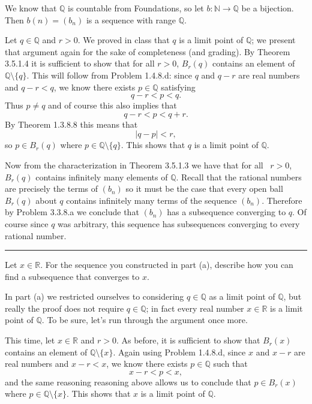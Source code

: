\documentclass[12pt]{article}
\newcommand{\R}{\mathbb R} %
\newcommand{\N}{\mathbb N} %
\newcommand{\Q}{\mathbb Q} %
\newcommand{\ran}{\mathcal{R}an}
\newenvironment{ppart}[1]{\noindent {\bf (#1) }}{\medskip}
\newenvironment{proof}{\noindent {\bf Proof: }}{\hfill
\rule{1mm}{3mm} \bigskip}
\newcommand{\sing}[1]{\{#1\}}
\begin{document}
\begin{proof} We know that $\Q$ is countable from Foundations, so let $b:\N\to\Q$ be a bijection. Then $b(n)=(b_n)$ is a sequence with range $\Q$.

Let $q\in\Q$ and $r>0$. We proved in class that $q$ is a limit point of $\Q$; we present that argument again for the sake of completeness (and grading). By Theorem 3.5.1.4 it is sufficient to show that for all $r>0$, $B_r(q)$ contains an element of $\Q\setminus\{q\}$. This will follow from Problem 1.4.8.d: since $q$ and $q-r$ are real numbers and $q-r<q$, we know there exists $p\in\Q$ satisfying $$q-r<p<q.$$ Thus $p\ne q$ and of course this also implies that $$q-r<p<q+r.$$ By Theorem 1.3.8.8 this means that $$|q-p|<r,$$ so $p\in B_r(q)$ where $p\in\Q\setminus\{q\}$. This shows that $q$ is a limit point of $\Q$.

Now from the characterization in Theorem 3.5.1.3 we have that for all \ $r>0$, $B_r(q)$ contains infinitely many elements of $\Q$. Recall that the rational numbers are precisely the terms of $(b_n)$ so it must be the case that every open ball $B_r(q)$ about $q$ contains infinitely many terms of the sequence $(b_n)$. %
 Therefore by Problem 3.3.8.a we conclude that $(b_n)$ has a subsequence converging to $q$. Of course since $q$ was arbitrary, this sequence has subsequences converging to every rational number.
\end{proof}


\begin{ppart}{b}Let $x\in\R$.  For the sequence you constructed in part (a), describe how you can find a subsequence that converges to $x$.\end{ppart}

In part (a) we restricted ourselves to considering $q\in\Q$ as a limit point of $\Q$, but really the proof does not require $q\in\Q$; in fact every real number $x\in\R$ is a limit point of $\Q$. To be sure, let's run through the argument once more.

This time, let $x\in\R$ and $r>0$. As before, it is sufficient to show that $B_r(x)$ contains an element of $\Q\setminus\{x\}.$ Again using Problem 1.4.8.d, since $x$ and $x-r$ are real numbers and $x-r<x$, we know there exists $p\in\Q$ such that $$x-r < p < x,$$ and the same reasoning reasoning above allows us to conclude that $p \in B_r(x)$ where $p\in\Q\setminus\sing{x}$. This shows that $x$ is a limit point of $\Q$.
\end{document}
